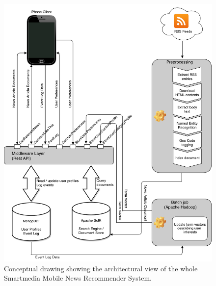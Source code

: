 \begin{figure}[!htbp]
\centering
\includegraphics[width=150mm]{GFX/tech/newsAppArchitecture.png}
\caption{Conceptual drawing showing the architectural view of the whole Smartmedia Mobile News Recommender System.}
\label{tech_news_app_architectural_view}
\end{figure}